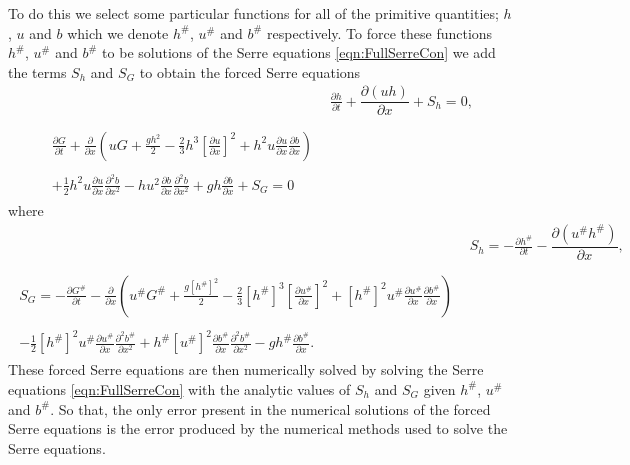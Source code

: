 \documentclass[times]{elsarticle}
\begin{document}
To do this we select some particular functions for all of the primitive quantities; $h$, $u$ and $b$ which we denote $h^\#$, $u^\#$ and $b^\#$ respectively. To force these functions $h^\#$, $u^\#$ and $b^\#$ to be solutions of the Serre equations \eqref{eqn:FullSerreCon} we add the terms $S_h$ and $S_G$ to obtain the forced Serre equations
\begin{subequations}
	\label{eqn:FullSerreConForced}
	\begin{align}
	& \frac{\partial h}{\partial t} + \dfrac{\partial (uh)}{\partial x} + S_{h}  = 0 ,\label{eqn:FullSerreConMassForced}  \\ \nonumber \\
	\begin{split}
	\label{eqn:SerreconsconmomForced}
	\frac{\partial G}{\partial t}  + \frac{\partial}{\partial x} \left( {u} G + \frac{gh^2}{2} - \frac{2}{3}h^3 \left[ \frac{\partial {u}}{\partial x} \right]^2 + h^2 {u}\frac{\partial {u}}{\partial x}\frac{\partial b}{\partial x} \right) \\ \\ + \frac{1}{2}h^2 {u} \frac{\partial {u}}{\partial x} \frac{\partial^2 b}{\partial x^2}  - h {u}^2\frac{\partial b}{\partial x}\frac{\partial^2 b}{\partial x^2} + gh\frac{\partial b}{\partial x} + S_{G} = 0
	\end{split}
	\end{align}
\end{subequations}
where
\begin{align*}
&  S_{h} = -\frac{\partial h^\#}{\partial t} - \dfrac{\partial (u^\#h^\#)}{\partial x} ,  \\ \nonumber \\
\begin{split}
S_{G} = -\frac{\partial G^\#}{\partial t}  - \frac{\partial}{\partial x} \left( {u}^\# G^\# + \frac{g\left[h^\#\right]^2}{2} - \frac{2}{3}\left[h^\#\right]^3 \left[\frac{\partial {u}^\#}{\partial x}\right]^2 + \left[h^\#\right]^2 {u^\#}\frac{\partial {u}^\#}{\partial x}\frac{\partial b^\#}{\partial x} \right) \\ \\ - \frac{1}{2}\left[h^\#\right]^2 {u}^\# \frac{\partial {u}^\#}{\partial x} \frac{\partial^2 b^\#}{\partial x^2}  + h^\# {\left[u^\#\right]}^2\frac{\partial b^\#}{\partial x}\frac{\partial^2 b^\#}{\partial x^2} - gh^\#\frac{\partial b^\#}{\partial x}.
\end{split}
\end{align*} 
These forced Serre equations are then numerically solved by solving the Serre equations \eqref{eqn:FullSerreCon} with the analytic values of $S_{h}$ and $S_{G}$ given $h^\#$, $u^\#$ and $b^\#$. So that, the only error present in the numerical solutions of the forced Serre equations is the error produced by the numerical methods used to solve the Serre equations.
\end{document}
